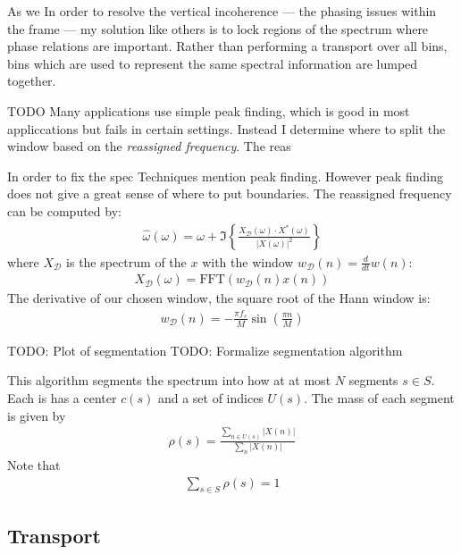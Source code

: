 \documentclass[12pt]{article}
\newcommand{\fft}{\text{FFT}}
\begin{document}
As we 
In order to resolve the vertical incoherence --- the phasing issues within the frame --- my solution like others is to lock regions of the spectrum where phase relations are important. Rather than performing a transport over all bins, bins which are used to represent the same spectral information are lumped together. 

TODO
Many applications use simple peak finding, which is good in most appliccations but fails in certain settings.
Instead I determine where to split the window based on the \emph{reassigned frequency}.
The reas


In order to fix the spec
Techniques mention peak finding.
However peak finding does not give a great sense of where to put boundaries. 
The reassigned frequency can be computed by:
\begin{align}
  \hat{\omega}(\omega) = 
  \omega + 
  \Im\left\{%
    \frac{X_\mathcal{D}(\omega)\cdot X^*(\omega)}{|X(\omega)|^2}
  \right\}
\end{align}
where $X_\mathcal{D}$ is the spectrum of the $x$ with the window
$w_\mathcal{D}(n) = \frac{d}{dt}w(n)$:
\begin{align}
  X_\mathcal{D}(\omega) = \fft\left(w_\mathcal{D}(n)x(n)\right)
\end{align}
The derivative of our chosen window, the square root of the Hann window is:
\begin{align}
   w_\mathcal{D}(n) = -\frac{\pi f_s}{M}\sin\left(\frac{\pi n}{M}\right)
\end{align}

TODO: Plot of segmentation
TODO: Formalize segmentation algorithm

This algorithm segments the spectrum into how at at most $N$ segments $s\in S$.
Each is has a center $c(s)$ and a set of indices $U(s)$.
The mass of each segment is given by 
\begin{align}
  \rho(s) = \frac{\sum_{n\in U(s)}|X(n)|}{\sum_{n}|X(n)|}
\end{align}
Note that
\begin{align}
  \sum_{s\in S} \rho(s) = 1
\end{align}

\subsection{Transport}
\end{document}
